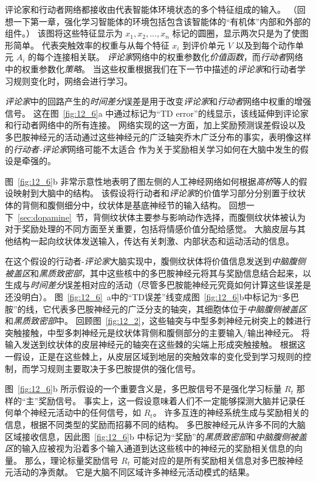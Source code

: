 评论家和行动者网络都接收由代表智能体环境状态的多个特征组成的输入。
（回想一下第一章，强化学习智能体的环境包括包含该智能体的“有机体”内部和外部的组件。）
该图将这些特征显示为 $x_1,x_2,...,x_n$ 标记的圆圈，显示两次只是为了使图形简单。
代表突触效率的权重与从每个特征 $x_i$ 到评价单元 $V$ 以及到每个动作单元 $A_i$ 的每个连接相关联。
\textit{评论家}网络中的权重参数化\textit{价值函数}，而\textit{行动者}网络中的权重参数化\textit{策略}。
当这些权重根据我们在下一节中描述的\textit{评论家}和行动者学习规则变化时，网络会进行学习。


\textit{评论家}中的回路产生的\textit{时间差分}误差是用于改变\textit{评论家}和\textit{行动者}网络中权重的增强信号。
这在图~\ref{fig:12_6}a 中通过标记为“TD error”的线显示，该线延伸到评论家和行动者网络中的所有连接。
网络实现的这一方面，加上奖励预测误差假设以及多巴胺神经元的活动通过这些神经元的广泛轴突乔木广泛分布的事实，表明像这样的\textit{行动者-评论家}网络可能不太适合 作为关于奖励相关学习如何在大脑中发生的假设是牵强的。


图~\ref{fig:12_6}b 非常示意性地表明了图左侧的人工神经网络如何根据\textit{高桥}等人的假设映射到大脑中的结构\cite{takahashi2008silencing}。
该假设将行动者和\textit{评论家}的价值学习部分分别置于纹状体的背侧和腹侧细分中，纹状体是基底神经节的输入结构。
回想一下~\ref{sec:dopamine}~节，背侧纹状体主要参与影响动作选择，而腹侧纹状体被认为对于奖励处理的不同方面至关重要，包括将情感价值分配给感觉。
大脑皮层与其他结构一起向纹状体发送输入，传达有关刺激、内部状态和运动活动的信息。


在这个假设的行动者-\textit{评论家}大脑实现中，腹侧纹状体将价值信息发送到\textit{中脑腹侧被盖区}和\textit{黑质致密部}，其中这些核中的多巴胺神经元将其与奖励信息结合起来，以生成与\textit{时间差分}误差相对应的活动（尽管多巴胺能神经元究竟如何计算这些误差是还没明白）。
图~\ref{fig:12_6}~a中的“TD误差”线变成图~\ref{fig:12_6}b中标记为“多巴胺”的线，它代表多巴胺神经元的广泛分支的轴突，其细胞体位于\textit{中脑腹侧被盖区}和\textit{黑质致密部}中。
回顾图~\ref{fig:12_2}，这些轴突与中型多刺神经元树突上的棘进行突触接触，中型多刺神经元是纹状体背侧和腹侧部分的主要输入/输出神经元。
将输入发送到纹状体的皮层神经元的轴突在这些棘的尖端上形成突触接触。
根据这一假设，正是在这些棘上，从皮层区域到地层的突触效率的变化受到学习规则的控制，而学习规则主要取决于多巴胺提供的强化信号。


图~\ref{fig:12_6}b 所示假设的一个重要含义是，多巴胺信号不是强化学习标量 $R_t$ 那样的“主”奖励信号。
事实上，这一假设意味着人们不一定能够探测大脑并记录任何单个神经元活动中的任何信号，如 $R_t$。
许多互连的神经系统生成与奖励相关的信息，根据不同类型的奖励而招募不同的结构。
多巴胺神经元从许多不同的大脑区域接收信息，因此图~\ref{fig:12_6}b 中标记为“奖励”的\textit{黑质致密部}和\textit{中脑腹侧被盖区}的输入应被视为沿着多个输入通道到达这些核中的神经元的奖励相关信息的向量。
那么，理论标量奖励信号 $R_t$ 可能对应的是所有奖励相关信息对多巴胺神经元活动的净贡献。
它是大脑不同区域许多神经元活动模式的结果。


